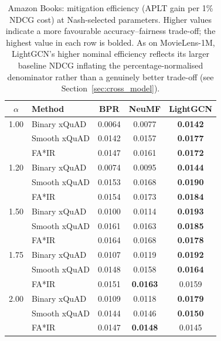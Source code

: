 \begin{table}[htbp]
\centering
\caption{Amazon Books: mitigation efficiency (APLT gain per 1\% NDCG cost) at Nash-selected parameters. Higher values indicate a more favourable accuracy--fairness trade-off; the highest value in each row is bolded. As on MovieLens-1M, LightGCN's higher nominal efficiency reflects its larger baseline NDCG inflating the percentage-normalised denominator rather than a genuinely better trade-off (see Section~\ref{sec:cross_model}).}
\label{tab:efficiency_ab}
\begin{tabular}{clccc}
\toprule
$\alpha$ & Method & BPR & NeuMF & LightGCN \\
\midrule
1.00 & Binary xQuAD & 0.0064 & 0.0077 & \textbf{0.0142} \\
\rowcolor{gray!6}  & Smooth xQuAD & 0.0142 & 0.0157 & \textbf{0.0177} \\
 & FA*IR & 0.0147 & 0.0161 & \textbf{0.0172} \\
\midrule
1.20 & Binary xQuAD & 0.0074 & 0.0095 & \textbf{0.0144} \\
\rowcolor{gray!6}  & Smooth xQuAD & 0.0153 & 0.0168 & \textbf{0.0190} \\
 & FA*IR & 0.0154 & 0.0173 & \textbf{0.0184} \\
\midrule
1.50 & Binary xQuAD & 0.0100 & 0.0114 & \textbf{0.0193} \\
\rowcolor{gray!6}  & Smooth xQuAD & 0.0161 & 0.0163 & \textbf{0.0185} \\
 & FA*IR & 0.0164 & 0.0168 & \textbf{0.0178} \\
\midrule
1.75 & Binary xQuAD & 0.0107 & 0.0119 & \textbf{0.0192} \\
\rowcolor{gray!6}  & Smooth xQuAD & 0.0148 & 0.0158 & \textbf{0.0164} \\
 & FA*IR & 0.0151 & \textbf{0.0163} & 0.0159 \\
\midrule
2.00 & Binary xQuAD & 0.0109 & 0.0118 & \textbf{0.0179} \\
\rowcolor{gray!6}  & Smooth xQuAD & 0.0144 & 0.0146 & \textbf{0.0150} \\
 & FA*IR & 0.0147 & \textbf{0.0148} & 0.0145 \\
\bottomrule
\end{tabular}
\end{table}